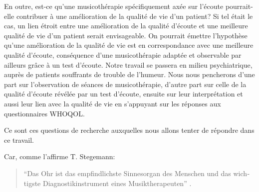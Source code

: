 En outre, est-ce qu'une musicothérapie spécifiquement axée sur l'écoute pourrait-elle  contribuer à une 
amélioration de la qualité de vie d'un patient? 
Si tel était  le cas, un lien étroit entre une amélioration de la 
qualité d'écoute  et une meilleure qualité de vie  d'un patient serait envisageable.
On pourrait émettre l'hypothèse qu'une amélioration de la qualité de vie est en correspondance avec une 
meilleure qualité d'écoute, conséquence d'une musicothérapie adaptée et observable par ailleurs grâce à 
un test d'écoute.
  Notre travail se passera  en milieu psychiatrique, 
auprès de patients souffrants de trouble de l'humeur.
Nous  nous pencherons d'une part sur l'observation de séances de musicothérapie, 
d'autre part sur celle de la qualité d'écoute révélée par un test d'écoute, ensuite sur leur interprétation
 et aussi leur lien avec la qualité de vie en s'appuyant sur les réponses aux questionnaires  
WHOQOL.  


Ce sont ces questions de recherche auxquelles nous allons tenter de répondre dans ce travail.


Car, comme l'affirme T. Stegemann:
\begin{quotation}
	\begin{german}
	``Das Ohr ist das empfindlichste
    Sinnesorgan des Menschen und das wichtigste Diagnostikinstrument
    eines Musiktherapeuten'' \autocite[p. 44]{seminar_zuerich}.
\end{german}
 \end{quotation}


 
